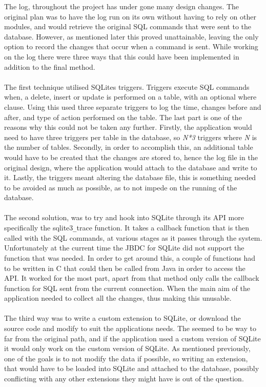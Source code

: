 The log, throughout the project has under gone many design changes. The original plan was to have the log run on its own without having to rely on other modules, and would retrieve the original SQL commands that were sent to the database. However, as mentioned later this proved unattainable, leaving the only option to record the changes that occur when a command is sent. While working on the log there were three ways that this could have been implemented in addition to the final method.
\\\\
The first technique utilised SQLites triggers. Triggers execute SQL commands when, a delete, insert or update is performed on a table, with an optional where clause. Using this \cite{sqlitetriggers} used three separate triggers to log the time, changes before and after, and type of action performed on the table. The last part is one of the reasons why this could not be taken any further. Firstly, the application would need to have three triggers per table in the database, so \textit{N*3} triggers where \textit{N} is the number of tables. Secondly, in order to accomplish this, an additional table would have to be created that the changes are stored to, hence the log file in the original design, where the application would attach to the database and write to it. Lastly, the triggers meant altering the database file, this is something needed to be avoided as much as possible, as to not impede on the running of the database.  
\\\\
The second solution, was to try and hook into SQLite through its API more specifically the sqlite3\verb|_|trace function. It takes a callback function that is then called with the SQL commands, at various stages as it passes through the system. Unfortunately at the current time the JBDC for SQLite did not support the function that was needed. In order to get around this, a couple of functions had to be written in C that could then be called from Java in order to access the API. It worked for the most part, apart from that method only calls the callback function for SQL sent from the current connection. When the main aim of the application needed to collect all the changes, thus making this unusable. 
\\\\
The third way was to write a custom extension to SQLite, or download the source code and modify to suit the applications needs. The seemed to be way to far from the original path, and if the application used a custom version of SQLite it would only work on the custom version of SQLite. As mentioned previously, one of the goals is to not modify the data if possible, so writing an extension, that would have to be loaded into SQLite and attached to the database, possibly conflicting with any other extensions they might have is out of the question.
